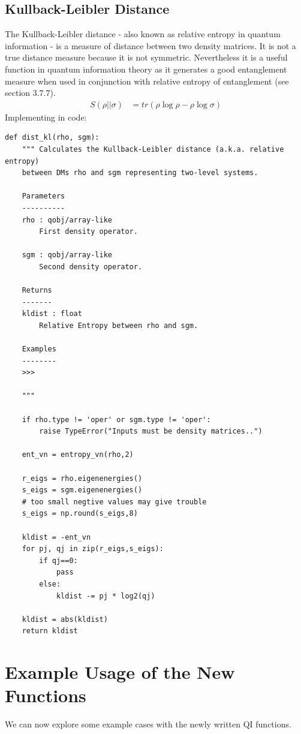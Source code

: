 \subsection{Kullback-Leibler Distance}
The Kullback-Leibler distance - also known as relative entropy in quantum information - is a measure of distance between two density matrices. It is not a true distance measure because it is not symmetric. Nevertheless it is a useful function in quantum information theory as it generates a good entanglement measure when used in conjunction with relative entropy of entanglement (see section 3.7.7). \cite{vedralteleportation}
\begin{align*}
S(\rho||\sigma) &= tr ( \rho \log \rho - \rho \log \sigma )
\end{align*}
Implementing in code:
\begin{verbatim}
def dist_kl(rho, sgm):
    """ Calculates the Kullback-Leibler distance (a.k.a. relative entropy)
    between DMs rho and sgm representing two-level systems.
    
    Parameters
    ----------
    rho : qobj/array-like
        First density operator.

    sgm : qobj/array-like
        Second density operator.

    Returns
    -------
    kldist : float
        Relative Entropy between rho and sgm.

    Examples
    --------
    >>> 
    
    """
    
    if rho.type != 'oper' or sgm.type != 'oper':
        raise TypeError("Inputs must be density matrices..")
    
    ent_vn = entropy_vn(rho,2)
    
    r_eigs = rho.eigenenergies()
    s_eigs = sgm.eigenenergies()
    # too small negtive values may give trouble
    s_eigs = np.round(s_eigs,8)
    
    kldist = -ent_vn
    for pj, qj in zip(r_eigs,s_eigs):
        if qj==0:
            pass
        else:
            kldist -= pj * log2(qj)
            
    kldist = abs(kldist)
    return kldist
\end{verbatim}


\section{Example Usage of the New Functions}
We can now explore some example cases with the newly written QI functions.

